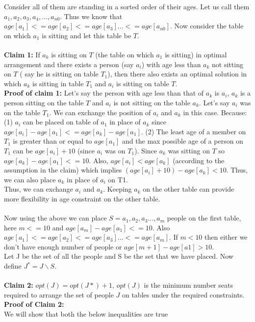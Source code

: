 \documentclass{article}
\begin{document}
Consider all of them are standing in a sorted order of their ages. Let us call them $a_1, a_2, a_3, a_4, ... , a_{n0}$. Thus we know that $age[a_1] <= age[a_2] <= age[a_3] ... <= age[a_{n0}]$. Now consider the table on which $a_1$ is sitting and let this table be $T$.
\\\\
\textbf{Claim 1:} If $a_k$ is sitting on $T$ (the table on which $a_1$ is sitting) in optimal arrangement and there exists a person (say $a_i$) with age less than $a_k$ not sitting on $T$ ( say he is sitting on table $T_1$), then there also exists an optimal solution in which $a_k$ is sitting in table $T_1$ and $a_i$ is sitting on table $T$.\\
\textbf{Proof of claim 1:} Let's say the person with age less than that of $a_k$ is $a_i$, $a_k$ is a person sitting on the table $T$ and $a_i$ is not sitting on the table $a_k$. Let's say $a_i$ was on the table $T_1$. We can exchange the position of $a_i$ and $a_k$ in this case. Because: (1) $a_i$ can be placed on table of $a_1$ in place of $a_k$ since $age[a_i] - age[a_1] <= age[a_k] - age[a_1]$. (2) The least age of a member on $T_1$ is greater than or equal to $age[a_1]$ and the max possible age of a person on $T_1$ can be $age[a_i]+10$ (since $a_i$ was on $T_1$). Since $a_k$ was sitting on $T$ so $age[a_k] - age[a_1]<= 10$. Also, $age[a_i] < age[a_k]$ (according to the assumption in the claim) which implies $(age[a_i]+10)-age[a_k] < 10$. Thus, we can also place $a_k$ in place of $a_i$ on T1. 
\\Thus, we can exchange $a_i$ and $a_k$. Keeping $a_k$ on the other table can provide more flexibility in age constraint on the other table.
\\\\
Now using the above we can place $S= {a_1, a_2, a_3 ... , a_m}$ people on the first table, here $m <=10$ and $age[a_m] - age[a_1] <=10$. Also $age[a_1] <= age[a_2] <= age[a_3] ... <= age[a_m]$. If $m< 10$ then either we don't have enough number of people or $age[m+1] - age[a1] >10$. 
\\
Let J be the set of all the people and S be the set that we have placed. Now define $J^* = J\backslash S$.
\\\\
\textbf{Claim 2:} $opt(J) = opt(J*) +1$, $opt(J)$ is the minimum number seats required to arrange the set of people $J$ on tables under the required constraints.\\
\textbf{Proof of Claim 2:}\\
We will show that both the below inequalities are true
\end{document}
